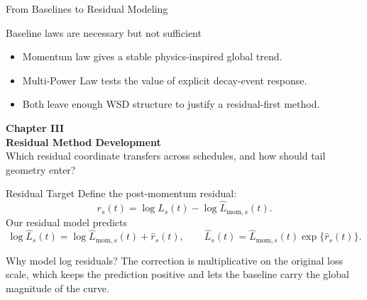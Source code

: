 \documentclass[fontset=fandol,aspectratio=169,10pt]{ctexbeamer}
\begin{document}
\begin{frame}{From Baselines to Residual Modeling}
  \begin{block}{Baseline laws are necessary but not sufficient}
    \begin{itemize}
      \item Momentum law gives a stable physics-inspired global trend.
      \item Multi-Power Law tests the value of explicit decay-event response.
      \item Both leave enough WSD structure to justify a residual-first method.
    \end{itemize}
  \end{block}
  \vspace{0.4em}
  \begin{center}
  \end{center}
\end{frame}

\begin{frame}[plain]
  \begin{center}
    \vspace{2.2em}
    {\Large\color{tdltBlue}\textbf{Chapter III}}\\[0.5em]
    {\huge\textbf{Residual Method Development}}\\[0.8em]
    \small Which residual coordinate transfers across schedules, and how should tail geometry enter?
  \end{center}
\end{frame}

\begin{frame}{Residual Target}
  Define the post-momentum residual:
  \[
    r_s(t)=\log L_s(t)-\log \widehat L_{\mathrm{mom},s}(t).
  \]
  Our residual model predicts
  \[
    \log \widehat L_s(t)=
    \log \widehat L_{\mathrm{mom},s}(t)+\widehat r_s(t),
    \qquad
    \widehat L_s(t)=\widehat L_{\mathrm{mom},s}(t)\exp\{\widehat r_s(t)\}.
  \]
  \begin{block}{Why model log residuals?}
    The correction is multiplicative on the original loss scale, which keeps the
    prediction positive and lets the baseline carry the global magnitude of the curve.
  \end{block}
\end{frame}
\end{document}
